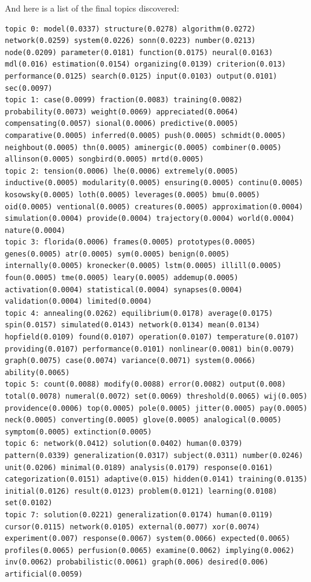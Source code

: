 \documentclass[10pt]{article}
\begin{document}
And here is a list of the final topics discovered:
\begin{verbatim}
topic 0: model(0.0337) structure(0.0278) algorithm(0.0272) network(0.0259) system(0.0226) sonn(0.0223) number(0.0213) node(0.0209) parameter(0.0181) function(0.0175) neural(0.0163) mdl(0.016) estimation(0.0154) organizing(0.0139) criterion(0.013) performance(0.0125) search(0.0125) input(0.0103) output(0.0101) sec(0.0097)
topic 1: case(0.0099) fraction(0.0083) training(0.0082) probability(0.0073) weight(0.0069) appreciated(0.0064) compensating(0.0057) sional(0.0006) predictive(0.0005) comparative(0.0005) inferred(0.0005) push(0.0005) schmidt(0.0005) neighbout(0.0005) thn(0.0005) aminergic(0.0005) combiner(0.0005) allinson(0.0005) songbird(0.0005) mrtd(0.0005)
topic 2: tension(0.0006) lhe(0.0006) extremely(0.0005) inductive(0.0005) modularity(0.0005) ensuring(0.0005) continu(0.0005) kosowsky(0.0005) loth(0.0005) leverages(0.0005) bmu(0.0005) oid(0.0005) ventional(0.0005) creatures(0.0005) approximation(0.0004) simulation(0.0004) provide(0.0004) trajectory(0.0004) world(0.0004) nature(0.0004)
topic 3: florida(0.0006) frames(0.0005) prototypes(0.0005) genes(0.0005) atr(0.0005) sym(0.0005) benign(0.0005) internally(0.0005) kronecker(0.0005) lstm(0.0005) illill(0.0005) foun(0.0005) tme(0.0005) leary(0.0005) addemup(0.0005) activation(0.0004) statistical(0.0004) synapses(0.0004) validation(0.0004) limited(0.0004)
topic 4: annealing(0.0262) equilibrium(0.0178) average(0.0175) spin(0.0157) simulated(0.0143) network(0.0134) mean(0.0134) hopfield(0.0109) found(0.0107) operation(0.0107) temperature(0.0107) providing(0.0107) performance(0.0101) nonlinear(0.0081) bin(0.0079) graph(0.0075) case(0.0074) variance(0.0071) system(0.0066) ability(0.0065)
topic 5: count(0.0088) modify(0.0088) error(0.0082) output(0.008) total(0.0078) numeral(0.0072) set(0.0069) threshold(0.0065) wij(0.005) providence(0.0006) top(0.0005) pole(0.0005) jitter(0.0005) pay(0.0005) neck(0.0005) converting(0.0005) glove(0.0005) analogical(0.0005) symptom(0.0005) extinction(0.0005)
topic 6: network(0.0412) solution(0.0402) human(0.0379) pattern(0.0339) generalization(0.0317) subject(0.0311) number(0.0246) unit(0.0206) minimal(0.0189) analysis(0.0179) response(0.0161) categorization(0.0151) adaptive(0.015) hidden(0.0141) training(0.0135) initial(0.0126) result(0.0123) problem(0.0121) learning(0.0108) set(0.0102)
topic 7: solution(0.0221) generalization(0.0174) human(0.0119) cursor(0.0115) network(0.0105) external(0.0077) xor(0.0074) experiment(0.007) response(0.0067) system(0.0066) expected(0.0065) profiles(0.0065) perfusion(0.0065) examine(0.0062) implying(0.0062) inv(0.0062) probabilistic(0.0061) graph(0.006) desired(0.006) artificial(0.0059)

\end{verbatim}
\end{document}
